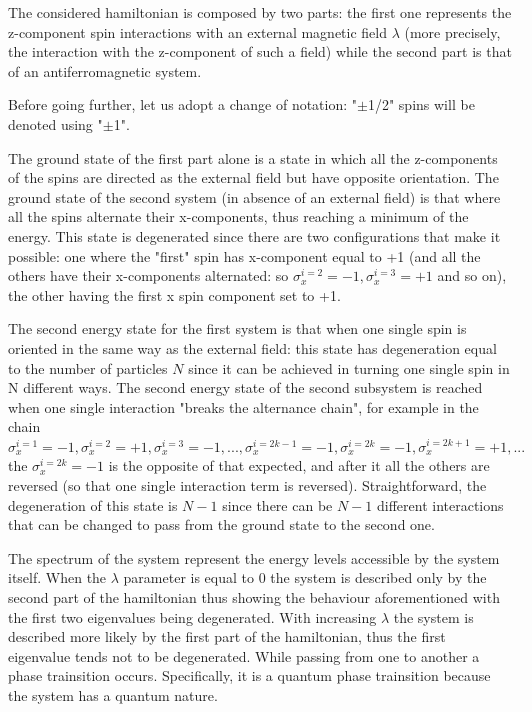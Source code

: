 \documentclass[12pt, a4paper, notitlepage]{report}
\begin{document}
The considered hamiltonian is composed by two parts: the first one represents the z-component spin interactions with an external magnetic field $\lambda$ (more precisely, the interaction with the z-component of such a field) while the second part is that of an antiferromagnetic system.

Before going further, let us adopt a change of notation: "$\pm$1/2" spins will be denoted using "$\pm$1".

The ground state of the first part alone is a state in which all the z-components of the spins are directed as the external field but have opposite orientation. The ground state of the second system (in absence of an external field) is that where all the spins alternate their x-components, thus reaching a minimum of the energy. This state is degenerated since there are two configurations that make it possible: one where the "first" spin has x-component equal to +1 (and all the others have their x-components alternated: so $\sigma_x^{i=2} = -1, \sigma_x^{i=3} = +1$ and so on), the other having the first x spin component set to +1.

The second energy state for the first system is that when one single spin is oriented in the same way as the external field: this state has degeneration equal to the number of particles $N$ since it can be achieved in turning one single spin in N different ways. The second energy state of the second subsystem is reached when one single interaction "breaks the alternance chain", for example in the chain $\sigma_x^{i=1} = -1, \sigma_x^{i=2} = +1, \sigma_x^{i=3} = -1, ... , \sigma_x^{i=2k-1} = -1, \sigma_x^{i=2k} = -1, \sigma_x^{i=2k+1} = +1, ...$ the $\sigma_x^{i=2k} = -1$ is the opposite of that expected, and after it all the others are reversed (so that one single interaction term is reversed). Straightforward, the degeneration of this state is $N-1$ since there can be $N-1$ different interactions that can be changed to pass from the ground state to the second one.

The spectrum of the system represent the energy levels accessible by the system itself. When the $\lambda$ parameter is equal to 0 the system is described only by the second part of the hamiltonian thus showing the behaviour aforementioned with the first two eigenvalues being degenerated. With increasing $\lambda$ the system is described more likely by the first part of the hamiltonian, thus the first eigenvalue tends not to be degenerated. While passing from one to another a phase trainsition occurs. Specifically, it is a quantum phase trainsition because the system has a quantum nature.
\end{document}
